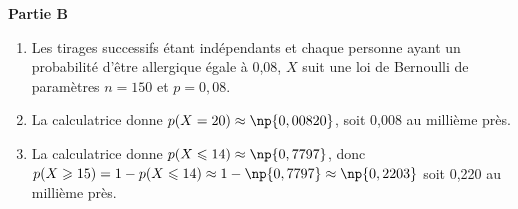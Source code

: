 
\textbf{Partie B}

\medskip

%
%
%

\begin{enumerate}
\item %

Les tirages successifs étant indépendants et chaque personne ayant un probabilité d'être allergique égale à 0,08, $X$ suit une loi de Bernoulli de paramètres $n = 150$ et $p = 0,08$.
\item %
La calculatrice donne $p(X = 20) \approx \np{0,00820}$, soit 0,008 au millième près.
\item %
La calculatrice donne $p(X \leqslant 14) \approx \np{0,7797}$, donc $p(X \geqslant 15) = 1 - p(X \leqslant 14) \approx 1 - \np{0,7797} \approx \np{0,2203}$ soit 0,220 au millième près.
\end{enumerate}

\bigskip

